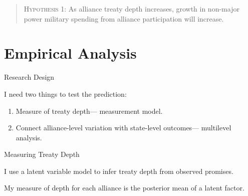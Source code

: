 \documentclass[12pt]{beamer}
\begin{document}

\begin{frame}[standout]

\begin{quote}
\textsc{Hypothesis 1}: As alliance treaty depth increases, growth in non-major power military spending from alliance participation will increase. 
\end{quote} 


\end{frame}


\section{Empirical Analysis} 


\begin{frame}{Research Design}

I need two things to test the prediction: 

\pause 
\begin{enumerate} 
\item Measure of treaty depth--- measurement model. 
\pause
\item Connect alliance-level variation with state-level outcomes--- multilevel analysis.  
\end{enumerate} 


\end{frame}


\begin{frame}{Measuring Treaty Depth}

I use a latent variable model to infer treaty depth from observed promises. 

\pause 

My measure of depth for each alliance is the posterior mean of a latent factor. 

\end{frame} 

\end{document}
